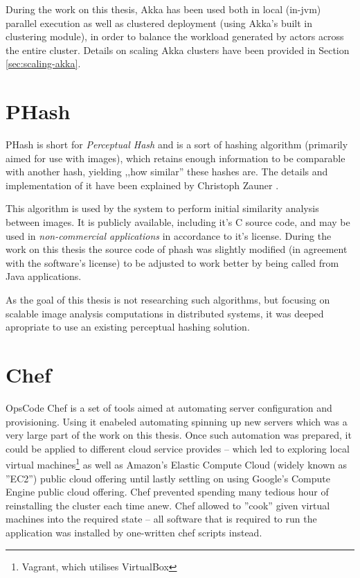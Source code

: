 During the work on this thesis, Akka has been used both in local (in-jvm) parallel execution as well as clustered deployment (using Akka's built in clustering module), in order to balance the workload generated by actors across the entire cluster. Details on scaling Akka clusters have been provided in Section \ref{sec:scaling-akka}.

\section{PHash}
\label{sec:phash}
PHash is short for \textit{Perceptual Hash} and is a sort of hashing algorithm (primarily aimed for use with images), which retains enough information to be comparable with another hash, yielding ,,how similar'' these hashes are. The details and implementation of it have been explained by Christoph Zauner \cite{phash}.

This algorithm is used by the system to perform initial similarity analysis between images. It is publicly available, including it's C source code, and may be used in \textit{non-commercial applications} in accordance to it's license. During the work on this thesis the source code of phash was slightly modified (in agreement with the software's license) to be adjusted to work better by being called from Java applications.

As the goal of this thesis is not researching such algorithms, but focusing on scalable image analysis computations in distributed systems, it was deeped apropriate to use an existing perceptual hashing solution.

\section{Chef}
\label{sec:chef}
OpsCode Chef is a set of tools aimed at automating server configuration and provisioning. Using it enabeled automating spinning up new servers which was a very large part of the work on this thesis. Once such automation was prepared, it could     be applied to different cloud service provides -- which led to exploring local virtual machines\footnote{Vagrant, which utilises VirtualBox} as well as Amazon's Elastic Compute Cloud (widely known as ''EC2'') public cloud offering until lastly settling on using Google's Compute Engine public cloud offering. Chef prevented spending many  tedious hour of reinstalling the cluster each time anew. Chef allowed to ''cook'' given virtual machines into the required state -- all software that is required to run the application was installed by one-written chef scripts instead.

